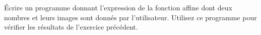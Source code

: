 %
%
%
\begin{exr}
\'Ecrire un programme donnant l'expression de la fonction affine dont deux nombres et leurs images sont donnés par l'utilisateur. 
Utilisez ce programme pour vérifier les résultats de l'exercice précédent.
\end{exr}